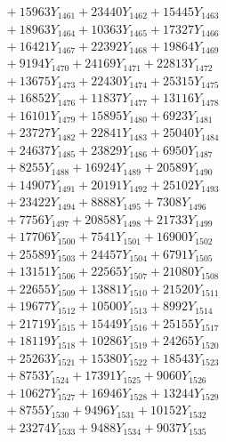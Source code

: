 \documentclass[a4paper,10pt]{article}
\begin{document}
{\begin{align}
&\;  + 15963 Y_{1461} + 23440 Y_{1462} + 15445 Y_{1463} \\[0.3ex]
&\;  + 18963 Y_{1464} + 10363 Y_{1465} + 17327 Y_{1466} \\[0.3ex]
&\;  + 16421 Y_{1467} + 22392 Y_{1468} + 19864 Y_{1469} \\[0.5ex]\allowbreak
&\;  + 9194 Y_{1470} + 24169 Y_{1471} + 22813 Y_{1472} \\[0.3ex]
&\;  + 13675 Y_{1473} + 22430 Y_{1474} + 25315 Y_{1475} \\[0.3ex]
&\;  + 16852 Y_{1476} + 11837 Y_{1477} + 13116 Y_{1478} \\[0.3ex]
&\;  + 16101 Y_{1479} + 15895 Y_{1480} + 6923 Y_{1481} \\[0.3ex]
&\;  + 23727 Y_{1482} + 22841 Y_{1483} + 25040 Y_{1484} \\[0.3ex]
&\;  + 24637 Y_{1485} + 23829 Y_{1486} + 6950 Y_{1487} \\[0.3ex]
&\;  + 8255 Y_{1488} + 16924 Y_{1489} + 20589 Y_{1490} \\[0.3ex]
&\;  + 14907 Y_{1491} + 20191 Y_{1492} + 25102 Y_{1493} \\[0.3ex]
&\;  + 23422 Y_{1494} + 8888 Y_{1495} + 7308 Y_{1496} \\[0.3ex]
&\;  + 7756 Y_{1497} + 20858 Y_{1498} + 21733 Y_{1499} \\[0.5ex]\allowbreak
&\;  + 17706 Y_{1500} + 7541 Y_{1501} + 16900 Y_{1502} \\[0.3ex]
&\;  + 25589 Y_{1503} + 24457 Y_{1504} + 6791 Y_{1505} \\[0.3ex]
&\;  + 13151 Y_{1506} + 22565 Y_{1507} + 21080 Y_{1508} \\[0.3ex]
&\;  + 22655 Y_{1509} + 13881 Y_{1510} + 21520 Y_{1511} \\[0.3ex]
&\;  + 19677 Y_{1512} + 10500 Y_{1513} + 8992 Y_{1514} \\[0.3ex]
&\;  + 21719 Y_{1515} + 15449 Y_{1516} + 25155 Y_{1517} \\[0.3ex]
&\;  + 18119 Y_{1518} + 10286 Y_{1519} + 24265 Y_{1520} \\[0.3ex]
&\;  + 25263 Y_{1521} + 15380 Y_{1522} + 18543 Y_{1523} \\[0.3ex]
&\;  + 8753 Y_{1524} + 17391 Y_{1525} + 9060 Y_{1526} \\[0.3ex]
&\;  + 10627 Y_{1527} + 16946 Y_{1528} + 13244 Y_{1529} \\[0.5ex]\allowbreak
&\;  + 8755 Y_{1530} + 9496 Y_{1531} + 10152 Y_{1532} \\[0.3ex]
&\;  + 23274 Y_{1533} + 9488 Y_{1534} + 9037 Y_{1535} \\[0.3ex]

\end{align}}
\end{document}
